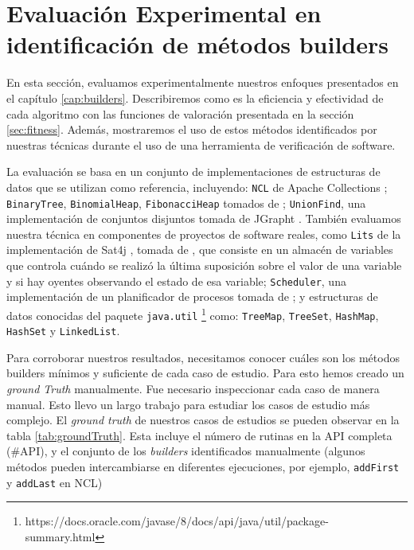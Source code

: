 

\section{Evaluación Experimental en identificación de métodos builders}
\label{sec:buildersExp}
En esta sección, evaluamos experimentalmente nuestros enfoques presentados en el capítulo \ref{cap:builders}. Describiremos como es la eficiencia y efectividad de cada algoritmo con las funciones de valoración presentada en la sección \ref{sec:fitness}. Además, mostraremos el uso de estos métodos identificados por nuestras técnicas durante el uso de una herramienta de verificación de software.

La evaluación se basa en un conjunto de implementaciones de estructuras de datos que se utilizan como referencia, incluyendo: \verb"NCL" de Apache Collections \cite{apache}; \verb"BinaryTree", \verb"BinomialHeap", \verb"FibonacciHeap" tomados de \cite{Visser:2006}; \verb"UnionFind", una implementación de conjuntos disjuntos tomada de JGrapht \cite{jgrapht}. También evaluamos nuestra técnica en componentes de proyectos de software reales, como \verb"Lits" de la implementación de Sat4j \cite{sat4j}, tomada de \cite{Loncaric:2018}, que consiste en un almacén de variables que controla cuándo se realizó la última suposición sobre el valor de una variable y si hay oyentes observando el estado de esa variable; \verb"Scheduler", una implementación de un planificador de procesos tomada de \cite{sir}; y estructuras de datos conocidas del paquete \verb"java.util" \footnote{https://docs.oracle.com/javase/8/docs/api/java/util/package-summary.html} como: \verb"TreeMap", \verb"TreeSet", \verb"HashMap", \verb"HashSet" y \verb"LinkedList". 

Para corroborar nuestros resultados, necesitamos conocer cuáles son los métodos builders mínimos y suficiente de cada caso de estudio. Para esto hemos creado un \emph{ground Truth} manualmente. Fue necesario inspeccionar cada caso de manera manual. Esto llevo un largo trabajo para estudiar los casos de estudio más complejo. El \emph{ground truth} de nuestros casos de estudios se pueden observar en la tabla \ref{tab:groundTruth}. Esta incluye el número de rutinas en la API completa (\#API), y el conjunto de los \emph{builders} identificados manualmente (algunos métodos pueden intercambiarse en diferentes ejecuciones, por ejemplo, \texttt{addFirst} y \texttt{addLast} en NCL)
    
